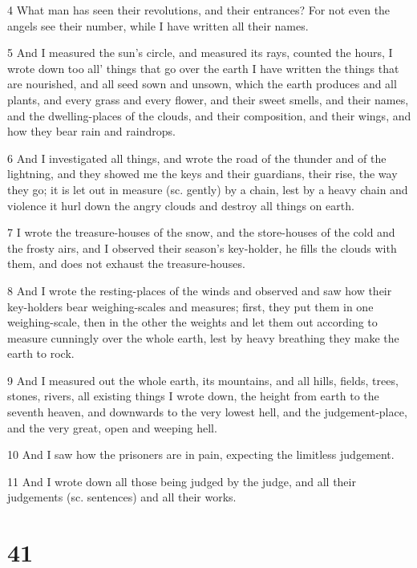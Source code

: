 \par 4 What man has seen their revolutions, and their entrances? For not even the angels see their number, while I have written all their names.

\par 5 And I measured the sun's circle, and measured its rays, counted the hours, I wrote down too all' things that go over the earth I have written the things that are nourished, and all seed sown and unsown, which the earth produces and all plants, and every grass and every flower, and their sweet smells, and their names, and the dwelling-places of the clouds, and their composition, and their wings, and how they bear rain and raindrops.

\par 6 And I investigated all things, and wrote the road of the thunder and of the lightning, and they showed me the keys and their guardians, their rise, the way they go; it is let out in measure (sc. gently) by a chain, lest by a heavy chain and violence it hurl down the angry clouds and destroy all things on earth.

\par 7 I wrote the treasure-houses of the snow, and the store-houses of the cold and the frosty airs, and I observed their season's key-holder, he fills the clouds with them, and does not exhaust the treasure-houses.

\par 8 And I wrote the resting-places of the winds and observed and saw how their key-holders bear weighing-scales and measures; first, they put them in one weighing-scale, then in the other the weights and let them out according to measure cunningly over the whole earth, lest by heavy breathing they make the earth to rock.

\par 9 And I measured out the whole earth, its mountains, and all hills, fields, trees, stones, rivers, all existing things I wrote down, the height from earth to the seventh heaven, and downwards to the very lowest hell, and the judgement-place, and the very great, open and weeping hell.

\par 10 And I saw how the prisoners are in pain, expecting the limitless judgement.

\par 11 And I wrote down all those being judged by the judge, and all their judgements (sc. sentences) and all their works.

\chapter{41}

